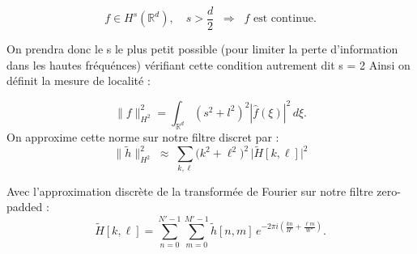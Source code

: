 \documentclass[12pt,a4paper]{article}
\begin{document}
\[
f \in H^s(\mathbb{R}^d), \quad s > \frac{d}{2} \;\; \Longrightarrow \;\; f \text{ est continue}.
\]

On prendra donc le s le plus petit possible (pour limiter la perte d'information dans les hautes fréquénces) vérifiant cette condition autrement dit s = 2
Ainsi on définit la mesure de localité : 

\[
\|f\|_{H^2}^2 = \int_{\mathbb{R}^d} (s^2+l^2)^2 |\hat{f}(\xi)|^2 \, d\xi.
\]
On approxime cette norme sur notre filtre discret par : 
\[
\|\widetilde{h}\|_{H^2}^2 \;\approx\; 
\sum_{k,\ell} \bigl(k^2 + \ell^2 \bigr)^2 \, \bigl| \widetilde{H}[k,\ell] \bigr|^2
\]

Avec l'approximation discrète de la transformée de Fourier sur notre filtre zero-padded : 
\[
\widetilde{H}[k,\ell] 
= \sum_{n=0}^{N'-1} \sum_{m=0}^{M'-1} 
\widetilde{h}[n,m] \, 
e^{-2 \pi i \left( \tfrac{k n}{H'} + \tfrac{\ell m}{W'} \right)} .
\]
\end{document}
